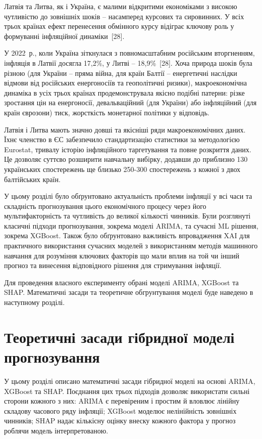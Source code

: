\documentclass{bachelor_thesis}
\begin{document}
Латвія та Литва, як і Україна, є малими відкритими економіками з високою чутливістю до зовнішніх шоків -- насамперед курсових та сировинних. У всіх трьох країнах ефект перенесення обмінного курсу відіграє ключову роль у формуванні інфляційної динаміки~[28].

У 2022~р., коли Україна зіткнулася з повномасштабним російським вторгненням, інфляція в Латвії досягла 17,2\%, у Литві -- 18,9\%~[28]. Хоча природа шоків була різною (для України -- пряма війна, для країн Балтії -- енергетичні наслідки відмови від російських енергоносіїв та геополітичні ризики), макроекономічна динаміка в усіх трьох країнах продемонструвала якісно подібні патерни: різке зростання цін на енергоносії, девальваційний (для України) або інфляційний (для країн єврозони) тиск, жорсткість монетарної політики у відповідь.

Латвія і Литва мають значно довші та якісніші ряди макроекономічних даних. Їхнє членство в ЄС забезпечило стандартизацію статистики за методологією Eurostat, тривалу історію інфляційного таргетування та повне розкриття даних. Це дозволяє суттєво розширити навчальну вибірку, додавши до приблизно 130 українських спостережень ще близько 250-300 спостережень з кожної з двох балтійських країн.


У цьому розділі було обґрунтовано актуальність проблеми інфляції у всі часи та складність прогнозування цього економічного процесу через його мультифакторність та чутливість до великої кількості чинників. Були розглянуті класичні підходи прогнозування, зокрема моделі ARIMA, та сучасні ML рішення, зокрема XGBoost. Також було обґрунтовано важливість впровадження XAI для практичного використання сучасних моделей з використанням методів машинного навчання для розуміння ключових факторів що мали вплив на той чи інший прогноз та винесення відповідного рішення для стримування інфляції.

Для проведення власного експерименту обрані моделі ARIMA, XGBoost та SHAP. Математичні засади та теоретичне обгрунтування моделі буде наведено в наступному розділі.

\chapter{Теоретичні засади гібридної моделі прогнозування}

У цьому розділі описано математичні засади гібридної моделі на основі ARIMA, XGBoost та SHAP. Поєднання цих трьох підходів дозволяє використати сильні сторони кожного з них: ARIMA є перевіреним і простим й вловлює лінійну складову часового ряду інфляції; XGBoost моделює нелінійність зовнішніх чинників; SHAP надає кількісну оцінку внеску кожного фактора у прогноз роблячи модель інтерпретованою.
\end{document}
